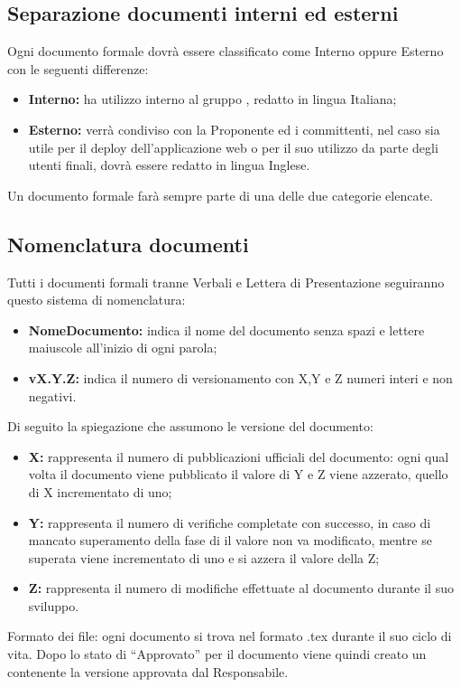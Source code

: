 \documentclass[NormeDiProgetto.tex]{subfiles}
\begin{document}
	\subsection{Separazione documenti interni ed esterni}
	Ogni documento formale dovrà essere classificato come Interno
	oppure Esterno con le seguenti differenze:
	\begin{itemize}
		\item \textbf{Interno:} ha utilizzo interno al gruppo \gruppo, redatto in lingua Italiana;
		\item \textbf{Esterno:} verrà condiviso con la Proponente ed i committenti, nel caso sia utile per il deploy dell'applicazione web o per il suo utilizzo da parte degli utenti finali, dovrà essere redatto in lingua Inglese.
	\end{itemize}
	Un documento formale farà sempre parte di una delle due categorie elencate.
	
	\subsection{Nomenclatura documenti}
	Tutti i documenti formali tranne Verbali e Lettera di Presentazione seguiranno questo sistema di nomenclatura:

	\begin{itemize}
		\item\textbf{NomeDocumento:} indica il nome del documento senza spazi e lettere maiuscole all'inizio di ogni parola;
		\item \textbf{vX.Y.Z:} indica il numero di versionamento con X,Y e Z numeri interi e non negativi.	
	\end{itemize}
	Di seguito la spiegazione che assumono le versione del documento:
	\begin{itemize}
		\item \textbf{X:} rappresenta il numero di pubblicazioni ufficiali del documento: ogni qual volta il documento viene pubblicato il valore di Y e Z viene azzerato, quello di X incrementato di uno;
		\item \textbf{Y:} rappresenta il numero di verifiche completate con successo, in caso di mancato superamento della fase di  il valore non va modificato, mentre se superata viene incrementato di uno e si azzera il valore della Z;
		\item \textbf{Z:} rappresenta il numero di modifiche effettuate al documento durante il suo sviluppo.	
	\end{itemize}
	Formato dei file: ogni documento si trova nel formato .tex durante il suo ciclo di vita.
	Dopo lo stato di “Approvato” per il documento viene quindi creato un  contenente la versione approvata dal Responsabile.
	
\end{document}
